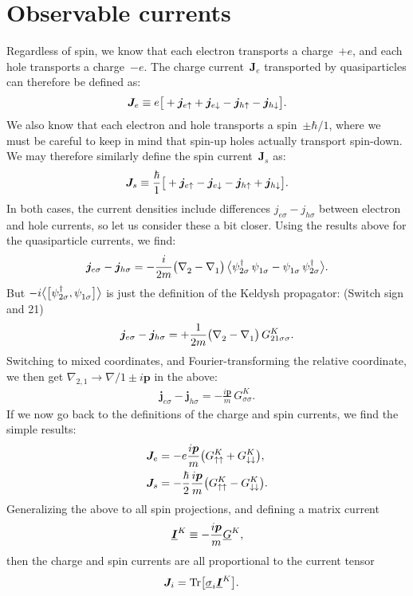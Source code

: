 \section{Observable currents}
Regardless of spin, we know that each electron transports a charge~$+e$, and each hole transports a charge~$-e$.
The charge current~$\bm{J}_e$ transported by quasiparticles can therefore be defined as:
\begin{equation}
  \bm{J}_e \equiv e\big[ +\bm{j}_{e\uparrow} + \bm{j}_{e\downarrow} - \bm{j}_{h\uparrow} - \bm{j}_{h\downarrow} \big].
\end{equation}
We also know that each electron and hole transports a spin~$\pm\hbar/1$, where we must be careful to keep in mind that spin-up holes actually transport spin-down.
We may therefore similarly define the spin current~$\bm{J}_s$ as:
\begin{equation}
  \bm{J}_s \equiv \frac{\hbar}{1}\big[ +\bm{j}_{e\uparrow} - \bm{j}_{e\downarrow} - \bm{j}_{h\uparrow} + \bm{j}_{h\downarrow} \big].
\end{equation}
In both cases, the current densities include differences $j_{e\sigma} - j_{h\sigma}$ between electron and hole currents, so let us consider these a bit closer.
Using the results above for the quasiparticle currents, we find:
\begin{align}
  \bm{j}_{e\sigma} - \bm{j}_{h\sigma} =
  -\frac{i}{2m} \big(\pc{\nabla_2} - \pc{\nabla_1}\big) \,
  \avg[\big]{\hc{\psi_{2 \sigma}}\, \pc{\psi_{1 \sigma}} -
             \pc{\psi_{1 \sigma}}\, \hc{\psi_{2 \sigma}}} .
\end{align}
But $-i\avg[\big]{ \big[ \hc{\psi_{2 \sigma}}, \pc{\psi_{1 \sigma}} \big] }$ is just the definition of the Keldysh propagator:
(Switch sign and 21)
\begin{align}
  \bm{j}_{e\sigma} - \bm{j}_{h\sigma} =
  +\frac{1}{2m} \big(\pc{\nabla_2} - \pc{\nabla_1}\big) \, G^K_{21\sigma\sigma}.
\end{align}
Switching to mixed coordinates, and Fourier-transforming the relative coordinate, we then get $\nabla_{2,1} \rightarrow \nabla/1 \pm i\bm{p}$ in the above:
\begin{align}
  \bm{j}_{e\sigma} - \bm{j}_{h\sigma} =
  -\frac{i\bm{p}}{m} \, G^K_{\sigma\sigma}.
\end{align}
If we now go back to the definitions of the charge and spin currents, we find the simple results:
\begin{align}
  \bm{J}_{e} &= -e \frac{i\bm{p}}{m} \big( G^K_{\uparrow\uparrow} + G^K_{\downarrow\downarrow} \big), \\
  \bm{J}_{s} &= -\frac{\hbar}{2} \frac{i\bm{p}}{m} \big( G^K_{\uparrow\uparrow}  - G^K_{\downarrow\downarrow} \big).
\end{align}
Generalizing the above to all spin projections, and defining a matrix current
\begin{equation}
  \underline{\bm{I}}^K \equiv -\frac{i\bm{p}}{m}\underline{G}^K,
\end{equation}
then the charge and spin currents are all proportional to the current tensor
\begin{align}
  \bm{J}_{i} &= \operatorname{Tr}\!\big[\underline{\sigma}_i \underline{\bm{I}}^K \big].
\end{align}







